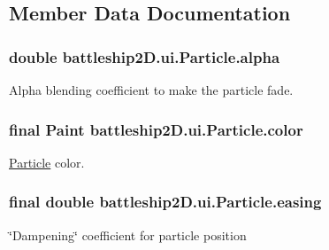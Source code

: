 \subsection{Member Data Documentation}
\hypertarget{classbattleship2D_1_1ui_1_1Particle_ad0c4375f37f512dfc526defc826ea8e1}{
\subsubsection[{alpha}]{\setlength{\rightskip}{0pt plus 5cm}double battleship2\-D.\-ui.\-Particle.\-alpha\hspace{0.3cm}{\ttfamily [private]}}}\label{classbattleship2D_1_1ui_1_1Particle_ad0c4375f37f512dfc526defc826ea8e1}


Alpha blending coefficient to make the particle fade. 

\hypertarget{classbattleship2D_1_1ui_1_1Particle_a0b9479695af9d931940e2bdff6877e80}{
\subsubsection[{color}]{\setlength{\rightskip}{0pt plus 5cm}final Paint battleship2\-D.\-ui.\-Particle.\-color\hspace{0.3cm}{\ttfamily [private]}}}\label{classbattleship2D_1_1ui_1_1Particle_a0b9479695af9d931940e2bdff6877e80}


\hyperlink{classbattleship2D_1_1ui_1_1Particle}{Particle} color. 

\hypertarget{classbattleship2D_1_1ui_1_1Particle_a702cb6c94a6bab26ab8f2d89e9ed006d}{
\subsubsection[{easing}]{\setlength{\rightskip}{0pt plus 5cm}final double battleship2\-D.\-ui.\-Particle.\-easing\hspace{0.3cm}{\ttfamily [private]}}}\label{classbattleship2D_1_1ui_1_1Particle_a702cb6c94a6bab26ab8f2d89e9ed006d}


\char`\"{}\-Dampening\char`\"{} coefficient for particle position 


